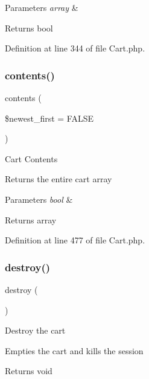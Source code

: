 \begin{DoxyParams}{Parameters}
{\em array} & \\
\hline
\end{DoxyParams}
\begin{DoxyReturn}{Returns}
bool 
\end{DoxyReturn}


Definition at line 344 of file Cart.\+php.

\mbox{\label{class_c_i___cart_a9d7b86f0ac41c6301e6373644011d87f}} 
\subsubsection{\texorpdfstring{contents()}{contents()}}
{\footnotesize\ttfamily contents (\begin{DoxyParamCaption}\item[{}]{\$newest\+\_\+first = {\ttfamily FALSE} }\end{DoxyParamCaption})}

Cart Contents

Returns the entire cart array


\begin{DoxyParams}{Parameters}
{\em bool} & \\
\hline
\end{DoxyParams}
\begin{DoxyReturn}{Returns}
array 
\end{DoxyReturn}


Definition at line 477 of file Cart.\+php.

\mbox{\label{class_c_i___cart_aa118461de946085fe42989193337044a}} 
\subsubsection{\texorpdfstring{destroy()}{destroy()}}
{\footnotesize\ttfamily destroy (\begin{DoxyParamCaption}{ }\end{DoxyParamCaption})}

Destroy the cart

Empties the cart and kills the session

\begin{DoxyReturn}{Returns}
void 
\end{DoxyReturn}


